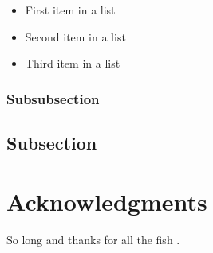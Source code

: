 \documentclass[fleqn,10pt]{SelfArx} %
\begin{document}
\begin{itemize}[noitemsep] %
\item First item in a list
\item Second item in a list
\item Third item in a list
\end{itemize}

\subsubsection{Subsubsection}

\lipsum[14] %

\subsection{Subsection}

\lipsum[15-23] %

\section*{Acknowledgments} %


So long and thanks for all the fish \cite{Figueredo:2009dg}.




\end{document}
